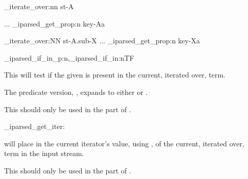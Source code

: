 \documentclass[10pt]{article}
\begin{document}
\begin{codestore}
  \starray_iterate_over:nn {st-A}
    {
      ... \starray_iparsed_get_prop:n {key-Aa}  %
      
      \starray_iterate_over:NN {st-A.sub-X}
        {
          ... \starray_iparsed_get_prop:n {key-Xa}  %
        }
    }
\end{codestore}

\begin{codedescribe}[code,EXP,new=2026/02/01]{\starray_iparsed_if_in_p:n,\starray_iparsed_if_in:nTF}
\begin{codesyntax}%
\end{codesyntax}
This will test if the given  is present in the current, iterated over, term. 
\end{codedescribe}
\begin{tsremark}
The predicate version, , expands to either  or \break {}.
\end{tsremark}
\begin{tsremark}
This should only be used in the  part of .
\end{tsremark}


\begin{codedescribe}[code,EXP,new=2026/02/01]{\starray_iparsed_get_iter:}
\begin{codesyntax}%
\end{codesyntax}
 will place in the current iterator's value,  using , of the current, iterated over, term in the input stream.
\end{codedescribe}
\begin{tsremark}
This should only be used in the  part of .
\end{tsremark}
\end{document}
